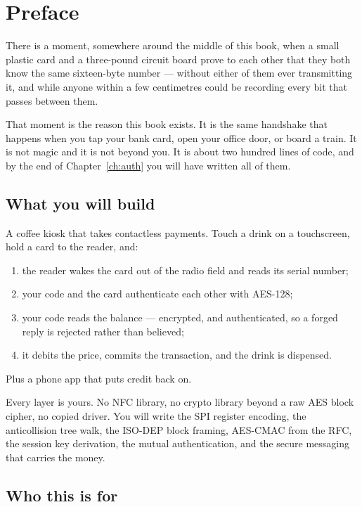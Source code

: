 \chapter*{Preface}

There is a moment, somewhere around the middle of this book, when a small
plastic card and a three-pound circuit board prove to each other that they both
know the same sixteen-byte number --- without either of them ever transmitting
it, and while anyone within a few centimetres could be recording every bit that
passes between them.

That moment is the reason this book exists. It is the same handshake that
happens when you tap your bank card, open your office door, or board a train.
It is not magic and it is not beyond you. It is about two hundred lines of code,
and by the end of Chapter~\ref{ch:auth} you will have written all of them.

\section*{What you will build}

A coffee kiosk that takes contactless payments. Touch a drink on a
touchscreen, hold a card to the reader, and:

\begin{enumerate}
  \item the reader wakes the card out of the radio field and reads its serial number;
  \item your code and the card authenticate each other with AES-128;
  \item your code reads the balance --- encrypted, and authenticated, so a
        forged reply is rejected rather than believed;
  \item it debits the price, commits the transaction, and the drink is dispensed.
\end{enumerate}

Plus a phone app that puts credit back on.

Every layer is yours. No NFC library, no crypto library beyond a raw AES block
cipher, no copied driver. You will write the SPI register encoding, the
anticollision tree walk, the ISO-DEP block framing, AES-CMAC from the RFC, the
session key derivation, the mutual authentication, and the secure messaging that
carries the money.

\section*{Who this is for}


